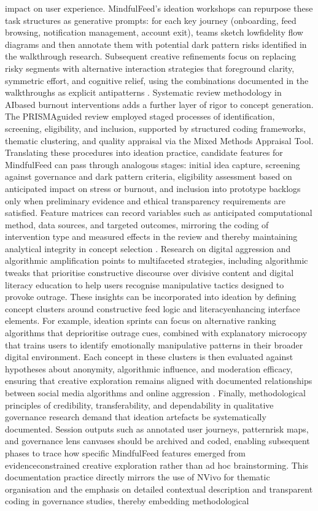 \documentclass{article}
\begin{document}
impact on user experience. MindfulFeed's ideation workshops can repurpose these task structures as generative prompts: for each key journey (onboarding, feed browsing, notification management, account exit), teams sketch low\-fidelity flow diagrams and then annotate them with potential dark pattern risks identified in the walkthrough research. Subsequent creative refinements focus on replacing risky segments with alternative interaction strategies that foreground clarity, symmetric effort, and cognitive relief, using the combinations documented in the walkthroughs as explicit anti\-patterns \parencites[3]{4692551}. Systematic review methodology in AI\-based burnout interventions adds a further layer of rigor to concept generation. The PRISMA\-guided review employed staged processes of identification, screening, eligibility, and inclusion, supported by structured coding frameworks, thematic clustering, and quality appraisal via the Mixed Methods Appraisal Tool. Translating these procedures into ideation practice, candidate features for MindfulFeed can pass through analogous stages: initial idea capture, screening against governance and dark pattern criteria, eligibility assessment based on anticipated impact on stress or burnout, and inclusion into prototype backlogs only when preliminary evidence and ethical transparency requirements are satisfied. Feature matrices can record variables such as anticipated computational method, data sources, and targeted outcomes, mirroring the coding of intervention type and measured effects in the review and thereby maintaining analytical integrity in concept selection \parencites[19]{8760542}. Research on digital aggression and algorithmic amplification points to multifaceted strategies, including algorithmic tweaks that prioritise constructive discourse over divisive content and digital literacy education to help users recognise manipulative tactics designed to provoke outrage. These insights can be incorporated into ideation by defining concept clusters around constructive feed logic and literacy\-enhancing interface elements. For example, ideation sprints can focus on alternative ranking algorithms that deprioritise outrage cues, combined with explanatory microcopy that trains users to identify emotionally manipulative patterns in their broader digital environment. Each concept in these clusters is then evaluated against hypotheses about anonymity, algorithmic influence, and moderation efficacy, ensuring that creative exploration remains aligned with documented relationships between social media algorithms and online aggression \parencites[5]{2937051}. Finally, methodological principles of credibility, transferability, and dependability in qualitative governance research demand that ideation artefacts be systematically documented. Session outputs such as annotated user journeys, pattern\-risk maps, and governance lens canvases should be archived and coded, enabling subsequent phases to trace how specific MindfulFeed features emerged from evidence\-constrained creative exploration rather than ad hoc brainstorming. This documentation practice directly mirrors the use of NVivo for thematic organisation and the emphasis on detailed contextual description and transparent coding in governance studies, thereby embedding methodological 
\end{document}
